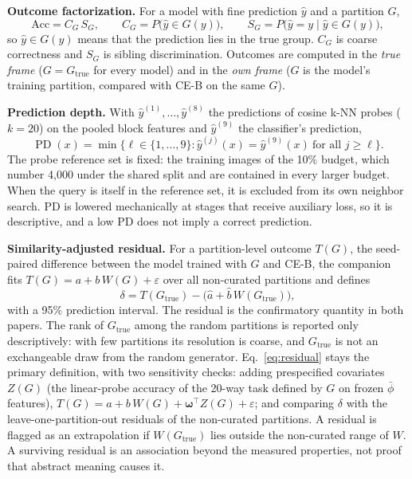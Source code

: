\documentclass{article} %
\newcommand{\cn}[1]{\textsc{#1}}
\newcommand{\Gtrue}{G_{\mathrm{true}}}
\newcommand{\PD}{\operatorname{PD}}
\begin{document}
\textbf{Outcome factorization.} For a model with fine prediction $\hat y$ and a partition $G$,
\begin{equation}
\mathrm{Acc}=C_G\,S_G,\qquad C_G=P\big(\hat y\in G(y)\big),\qquad S_G=P\big(\hat y=y\mid \hat y\in G(y)\big),
\label{eq:factor}
\end{equation}
so $\hat y\in G(y)$ means that the prediction lies in the true group. $C_G$ is coarse correctness and $S_G$ is sibling discrimination. Outcomes are computed in the \emph{true frame} ($G=\Gtrue$ for every model) and in the \emph{own frame} ($G$ is the model's training partition, compared with \cn{CE-B} on the same $G$).

\textbf{Prediction depth.} With $\hat y^{(1)},\ldots,\hat y^{(8)}$ the predictions of cosine k-NN probes ($k=20$) on the pooled block features and $\hat y^{(9)}$ the classifier's prediction,
\begin{equation}
\PD(x)=\min\big\{\ell\in\{1,\ldots,9\}:\hat y^{(j)}(x)=\hat y^{(9)}(x)\ \text{for all } j\geq\ell\big\}.
\label{eq:pd}
\end{equation}
The probe reference set is fixed: the training images of the 10\% budget, which number 4,000 under the shared split and are contained in every larger budget. When the query is itself in the reference set, it is excluded from its own neighbor search. PD is lowered mechanically at stages that receive auxiliary loss, so it is descriptive, and a low PD does not imply a correct prediction.

\textbf{Similarity-adjusted residual.} For a partition-level outcome $T(G)$, the seed-paired difference between the model trained with $G$ and \cn{CE-B}, the companion fits $T(G)=a+b\,W(G)+\varepsilon$ over all non-curated partitions and defines
\begin{equation}
\delta=T(\Gtrue)-\big(\hat a+\hat b\,W(\Gtrue)\big),
\label{eq:residual}
\end{equation}
with a 95\% prediction interval. The residual is the confirmatory quantity in both papers. The rank of $\Gtrue$ among the random partitions is reported only descriptively: with few partitions its resolution is coarse, and $\Gtrue$ is not an exchangeable draw from the random generator. Eq.~\ref{eq:residual} stays the primary definition, with two sensitivity checks: adding prespecified covariates $Z(G)$ (the linear-probe accuracy of the 20-way task defined by $G$ on frozen $\bar\phi$ features), $T(G)=a+b\,W(G)+\boldsymbol{\omega}^{\top}Z(G)+\varepsilon$; and comparing $\delta$ with the leave-one-partition-out residuals of the non-curated partitions. A residual is flagged as an extrapolation if $W(\Gtrue)$ lies outside the non-curated range of $W$. A surviving residual is an association beyond the measured properties, not proof that abstract meaning causes it.
\end{document}

